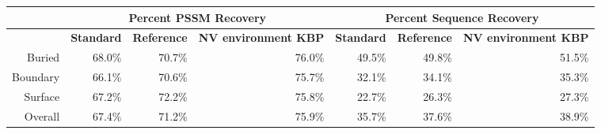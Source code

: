 \begin{tabular}{|r||r|r|r|r|r|r|}
\hline
 & \multicolumn{3}{c}{\textbf{Percent PSSM Recovery}} & \multicolumn{3}{|c|}{\textbf{Percent Sequence Recovery}}\\
\hline
  & \textbf{Standard} & \textbf{Reference} & \textbf{NV environment KBP} & \textbf{Standard} & \textbf{Reference} & \textbf{NV environment KBP} \\
\hline
\hline
Buried & 68.0\% & 70.7\% & 76.0\% & 49.5\% & 49.8\% & 51.5\% \\
\hline
Boundary & 66.1\% & 70.6\% & 75.7\% & 32.1\% & 34.1\% & 35.3\% \\
\hline
Surface & 67.2\% & 72.2\% & 75.8\% & 22.7\% & 26.3\% & 27.3\% \\
\hline
Overall & 67.4\% & 71.2\% & 75.9\% & 35.7\% & 37.6\% & 38.9\% \\
\hline
\end{tabular}